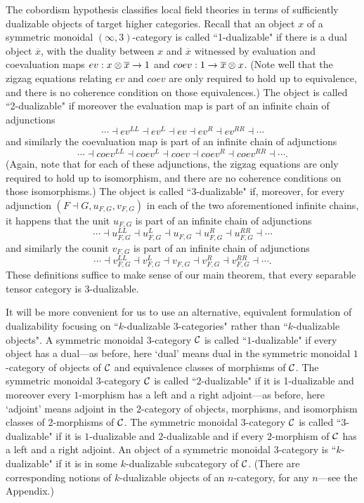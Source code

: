 \documentclass{amsart}
\begin{document}
The cobordism hypothesis \cite{MR1355899, lurie-ch} classifies local field theories in terms of sufficiently dualizable objects of target higher categories.  Recall that an object $x$ of a symmetric monoidal $(\infty,3)$-category is called ``1-dualizable" if there is a dual object $\overline{x}$, with the duality between $x$ and $\overline{x}$ witnessed by evaluation and coevaluation maps $ev: x \otimes \overline{x} \rightarrow 1$ and $coev: 1 \rightarrow \overline{x} \otimes x$.  (Note well that the zigzag equations relating $ev$ and $coev$ are only required to hold up to equivalence, and there is no coherence condition on those equivalences.)  The object is called ``2-dualizable" if moreover the evaluation map is part of an infinite chain of adjunctions 
$$\cdots \dashv ev^{LL} \dashv ev^L \dashv ev \dashv ev^R \dashv ev^{RR} \dashv \cdots$$
and similarly the coevaluation map is part of an infinite chain of adjunctions 
$$\cdots \dashv coev^{LL} \dashv coev^L \dashv coev \dashv coev^R \dashv coev^{RR} \dashv \cdots.$$  
(Again, note that for each of these adjunctions, the zigzag equations are only required to hold up to isomorphism, and there are no coherence conditions on those isomorphisms.)
The object is called ``3-dualizable" if, moreover, for every adjunction $(F \dashv G, u_{F,G}, v_{F,G})$ in each of the two aforementioned infinite chains, it happens that the unit $u_{F,G}$ is part of an infinite chain of adjunctions 
$$\cdots \dashv u_{F,G}^{LL} \dashv u_{F,G}^L \dashv u_{F,G} \dashv u_{F,G}^R \dashv u_{F,G}^{RR} \dashv \cdots$$ 
and similarly the counit $v_{F,G}$ is part of an infinite chain of adjunctions 
$$\cdots \dashv v_{F,G}^{LL} \dashv v_{F,G}^L \dashv v_{F,G} \dashv v_{F,G}^R \dashv v_{F,G}^{RR} \dashv \cdots.$$  These definitions suffice to make sense of our main theorem, that every separable tensor category is 3-dualizable.  

It will be more convenient for us to use an alternative, equivalent formulation of dualizability focusing on ``$k$-dualizable $3$-categories" rather than ``$k$-dualizable objects".  A symmetric monoidal $3$-category $\mathcal C$ is called ``$1$-dualizable" if every object has a dual---as before, here `dual' means dual in the symmetric monoidal $1$-category of objects of $\mathcal C$ and equivalence classes of morphisms of $\mathcal C$.  The symmetric monoidal $3$-category $\mathcal C$ is called ``$2$-dualizable" if it is 1-dualizable and moreover every $1$-morphism has a left and a right adjoint---as before, here `adjoint' means adjoint in the $2$-category of objects, morphisms, and isomorphism classes of 2-morphisms of $\mathcal C$.  The symmetric monoidal $3$-category $\mathcal C$ is called ``$3$-dualizable" if it is $1$-dualizable and $2$-dualizable and if every $2$-morphism of $\mathcal C$ has a left and a right adjoint.  An object of a symmetric monoidal $3$-category is ``$k$-dualizable" if it is in some $k$-dualizable subcategory of $\mathcal C$.  (There are corresponding notions of $k$-dualizable objects of an $n$-category, for any $n$---see the Appendix.)
\end{document}
